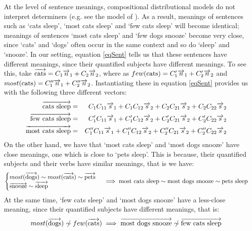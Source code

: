 At the level of sentence meanings,  compositional  distributional models  do not interpret determiners (e.g. see  the model of \cite{ML}). As a result, meanings of sentences such as `cats sleep', `most cats sleep' and `few cats sleep'  will become identical; meanings of sentences `most cats sleep' and `few dogs snooze' become very close, since `cats' and `dogs' often occur in the same context and so do `sleep' and `snooze'. In our setting, equation \ref{eqSent} tells us that these sentences have different meanings, since their quantified subjects have different meanings. To see this, take  $\overrightarrow{\text{cats}} = C_1 \overrightarrow{n}_1 + C_2 \overrightarrow{n}_2$, where as $few(\text{cats}) = C'_1 \overrightarrow{n}_1 + C'_2 \overrightarrow{n}_2$ and $most(\text{cats}) = C''_1 \overrightarrow{n}_1 + C''_2 \overrightarrow{n}_2$. Instantiating these in equation \ref{eqSent} provides us with the following three different vectors:
\begin{eqnarray*}
\overrightarrow{\mbox{cats sleep}} &=&C_1 C_{11} \overrightarrow{s}_1 + C_1 C_{12} \overrightarrow{s}_2 + C_2 C_{21} \overrightarrow{s}_2 + C_2 C_{22} \overrightarrow{s}_2\\
\overrightarrow{\mbox{few cats sleep}} &=&C'_1 C_{11} \overrightarrow{s}_1 + C'_1 C_{12} \overrightarrow{s}_2 + C'_2 C_{21} \overrightarrow{s}_2 + C'_2 C_{22} \overrightarrow{s}_2\\
\overrightarrow{\mbox{most cats sleep}} &=& C''_1 C_{11} \overrightarrow{s}_1 + C''_1 C_{12} \overrightarrow{s}_2 + C''_2 C_{21} \overrightarrow{s}_2 + C''_2 C_{22} \overrightarrow{s}_2
\end{eqnarray*}
On the other hand, we have  that `most cats sleep' and `most dogs snooze'  have close meanings, one which is close to `pets sleep'.  This is because, their quantified   subjects and their  verbs have similar meanings, that is we have:
\[
\begin{cases}
most(\overrightarrow{\text{dogs}}) \sim most(\overrightarrow{\text{cats}}) \sim  \overrightarrow{\text{pets}}&\\
\overrightarrow{\text{snooze}}  \sim \overrightarrow{\text{sleep}} &
\end{cases} \implies 
\mbox{most cats sleep}  \sim  \mbox{most dogs snooze} \sim
\mbox{pets sleep}
\]
At the same time,  `few cats sleep' and `most dogs snooze' have a less-close meaning, since their quantified  subjects have different meanings, that is:
\[
most(\ov{\text{dogs}}) \sim\!\!\!\!\!/ \ few(\ov{\text{cats}})  \implies \ov{\mbox{most dogs snooze}}  \sim\!\!\!\!\!/ \
\ov{\mbox{few cats sleep}}
\]


